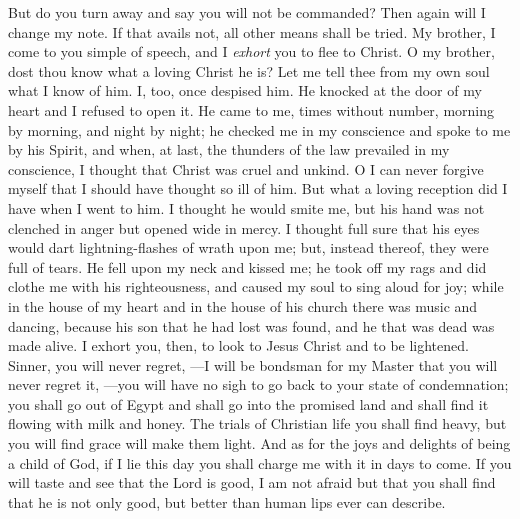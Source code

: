 \documentclass[
]{book}
\begin{document}
But do you turn away and say you will not be commanded? Then again will I change my note. If that avails not, all other means shall be tried. My brother, I come to you simple of speech, and I \emph{exhort} you to flee to Christ. O my brother, dost thou know what a loving Christ he is? Let me tell thee from my own soul what I know of him. I, too, once despised him. He knocked at the door of my heart and I refused to open it. He came to me, times without number, morning by morning, and night by night; he checked me in my conscience and spoke to me by his Spirit, and when, at last, the thunders of the law prevailed in my conscience, I thought that Christ was cruel and unkind. O I can never forgive myself that I should have thought so ill of him. But what a loving reception did I have when I went to him. I thought he would smite me, but his hand was not clenched in anger but opened wide in mercy. I thought full sure that his eyes would dart lightning-flashes of wrath upon me; but, instead thereof, they were full of tears. He fell upon my neck and kissed me; he took off my rags and did clothe me with his righteousness, and caused my soul to sing aloud for joy; while in the house of my heart and in the house of his church there was music and dancing, because his son that he had lost was found, and he that was dead was made alive. I exhort you, then, to look to Jesus Christ and to be lightened. Sinner, you will never regret, ---I will be bondsman for my Master that you will never regret it, ---you will have no sigh to go back to your state of condemnation; you shall go out of Egypt and shall go into the promised land and shall find it flowing with milk and honey. The trials of Christian life you shall find heavy, but you will find grace will make them light. And as for the joys and delights of being a child of God, if I lie this day you shall charge me with it in days to come. If you will taste and see that the Lord is good, I am not afraid but that you shall find that he is not only good, but better than human lips ever can describe.
\end{document}
